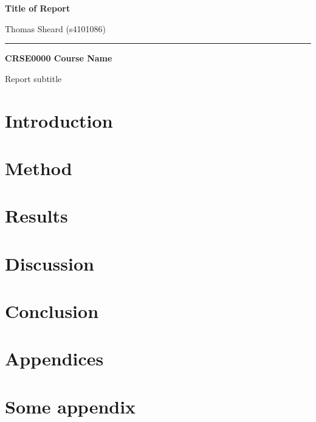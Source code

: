 \documentclass[12pt]{article}
\begin{document}

\thispagestyle{empty}


{\Large\textbf{Title of Report}}

Thomas Sheard (s4101086)
\vspace{1em}
\hrule
\begin{center}
  \textbf{CRSE0000 Course Name} \par
  Report subtitle
\end{center}

\tableofcontents

\clearpage


\section{Introduction}

\section{Method}

\section{Results}

\section{Discussion}

\section{Conclusion}

\clearpage

\section{Appendices}

\appendix

\section{Some appendix}
\label{appendix:some_appendix}

\end{document}
